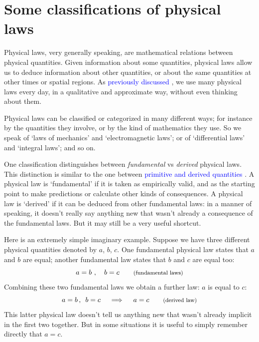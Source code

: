\documentclass[a4paper,12pt,%
onecolumn,oneside,%
british%
]{memoir}
\renewcommand*{\|}[1][]{\nonscript\:#1\vert\nonscript\:\mathopen{}}
\newcommand*{\sect}{\S}%
\renewcommand*{\autoref}[3][\sect\,\ref]{\textcolor{blue}{#3}
\raisebox{0.6ex}{\color{blue}\miniscule%
\faIcon{angle-right}%
\;#1{#2}\;p.\,\pageref{#2}}}
\begin{document}
\section{Some classifications of physical laws}
\label{sec:fundamental_derived}

Physical laws, very generally speaking, are mathematical relations between physical quantities. Given information about some quantities, physical laws allow us to deduce information about other quantities, or about the same quantities at other times or spatial regions. As \autoref{sec:phys_laws0}{previously discussed}, we use many physical laws every day, in a qualitative and approximate way, without even thinking about them.

Physical laws can be classified or categorized in many different ways; for instance by the quantities they involve, or by the kind of mathematics they use. So we speak of \enquote*{laws of mechanics} and \enquote*{electromagnetic laws}; or of \enquote*{differential laws} and \enquote*{integral laws}; and so on.

\medskip

One classification distinguishes between \emph{fundamental} vs \emph{derived} physical laws. This distinction is similar to the one between \autoref{sec:primitives}{primitive and derived quantities}. A physical law is \enquote*{fundamental} if it is taken as empirically valid, and as the starting point to make predictions or calculate other kinds of consequences. A physical law is \enquote*{derived} if it can be deduced from other fundamental laws: in a manner of speaking, it doesn't really say anything new that wasn't already a consequence of the fundamental laws. But it may still be a very useful shortcut.

Here is an extremely simple imaginary example. Suppose we have three different physical quantities denoted by $a$, $b$, $c$. One fundamental physical law states that $a$ and $b$ are equal; another fundamental law states that $b$ and $c$ are equal too:
\begin{equation*}
  a=b \ , \quad b=c \qquad\text{\footnotesize(fundamental laws)}
\end{equation*}
Combining these two fundamental laws we obtain a further law: $a$ is equal to $c$:
\begin{equation*}
  a=b\,,\enskip b=c \quad\implies\quad a=c\qquad\text{\footnotesize(derived law)}
\end{equation*}
This latter physical law doesn't tell us anything new that wasn't already implicit in the first two together. But in some situations it is useful to simply remember directly that $a=c$.
\end{document}
